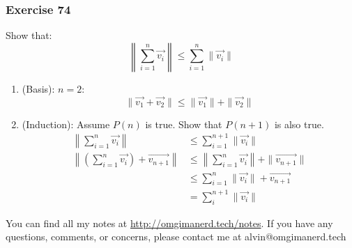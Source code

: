 \documentclass{math}
\begin{document}
\subsubsection*{Exercise 74}
Show that:
\[ \left\|\sum_{i=1}^{n}\vec{v_i}\right\| \le \sum_{i=1}^{n}\|\vec{v_i}\| \]
\begin{enumerate}
  \item (Basis): \( n = 2 \):
    \[ \|\vec{v_1}+\vec{v_2}\| \le \|\vec{v_1}\|+\|\vec{v_2}\| \]
  \item (Induction): Assume \( P(n) \) is true. Show that \( P(n+1) \) is also
    true.
    \begin{align*}
      \left\|\sum_{i=1}^{n}\vec{v_i}\right\| &\le
        \sum_{i=1}^{n+1}\|\vec{v_i}\| \\
      \left\|(\sum_{i=1}^{n}\vec{v_i})+\vec{v_{n+1}}\right\|
      &\le \left\|\sum_{i=1}^{n}\vec{v_i}\right\|+\|\vec{v_{n+1}}\| \\
      &\le \sum_{i=1}^{n}\|\vec{v_{i}}\|+\vec{v_{n+1}} \\
      &= \sum_{i}^{n+1}\|\vec{v_i}\|
    \end{align*}
\end{enumerate}

\begin{center}
  You can find all my notes at \url{http://omgimanerd.tech/notes}. If you have
  any questions, comments, or concerns, please contact me at
  alvin@omgimanerd.tech
\end{center}
\end{document}
